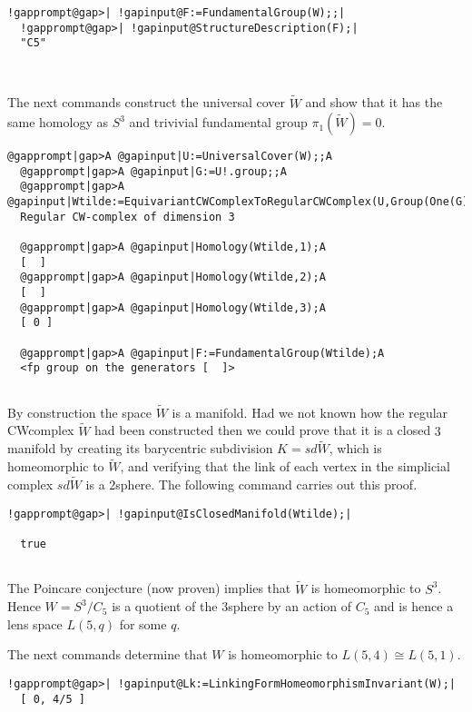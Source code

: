 \documentclass[a4paper,11pt]{report}
\begin{document}
{{\begin{Verbatim}[commandchars=!@|,fontsize=\small,frame=single,label=Example]
  !gapprompt@gap>| !gapinput@F:=FundamentalGroup(W);;|
  !gapprompt@gap>| !gapinput@StructureDescription(F);|
  "C5"
  
  
\end{Verbatim}
 

The next commands construct the universal cover $\widetilde W$ and show that it has the same homology as $S^3$ and trivivial fundamental group $\pi_1(\widetilde W)=0$. 
\begin{Verbatim}[commandchars=@|A,fontsize=\small,frame=single,label=Example]
  @gapprompt|gap>A @gapinput|U:=UniversalCover(W);;A
  @gapprompt|gap>A @gapinput|G:=U!.group;;A
  @gapprompt|gap>A @gapinput|Wtilde:=EquivariantCWComplexToRegularCWComplex(U,Group(One(G)));A
  Regular CW-complex of dimension 3
  
  @gapprompt|gap>A @gapinput|Homology(Wtilde,1);A
  [  ]
  @gapprompt|gap>A @gapinput|Homology(Wtilde,2);A
  [  ]
  @gapprompt|gap>A @gapinput|Homology(Wtilde,3);A
  [ 0 ]
  
  @gapprompt|gap>A @gapinput|F:=FundamentalGroup(Wtilde);A
  <fp group on the generators [  ]>
  
\end{Verbatim}
 By construction the space $\widetilde W$ is a manifold. Had we not known how the regular CW\texttt{}complex $\widetilde W$ had been constructed then we could prove that it is a closed $3$\texttt{}manifold by creating its barycentric subdivision $K=sd\widetilde W$, which is homeomorphic to $\widetilde W$, and verifying that the link of each vertex in the simplicial complex $sd\widetilde W$ is a $2$\texttt{}sphere. The following command carries out this proof. 
\begin{Verbatim}[commandchars=!@|,fontsize=\small,frame=single,label=Example]
  !gapprompt@gap>| !gapinput@IsClosedManifold(Wtilde);|
  
  true
  
\end{Verbatim}
 The Poincare conjecture (now proven) implies that $\widetilde W$ is homeomorphic to $S^3$. Hence $W=S^3/C_5$ is a quotient of the $3$\texttt{}sphere by an action of $C_5$ and is hence a lens space $L(5,q)$ for some $q$. 

 The next commands determine that $W$ is homeomorphic to $L(5,4)\cong L(5,1)$. 
\begin{Verbatim}[commandchars=!@|,fontsize=\small,frame=single,label=Example]
  !gapprompt@gap>| !gapinput@Lk:=LinkingFormHomeomorphismInvariant(W);|
  [ 0, 4/5 ]
  

\end{Verbatim}}}
\end{document}
